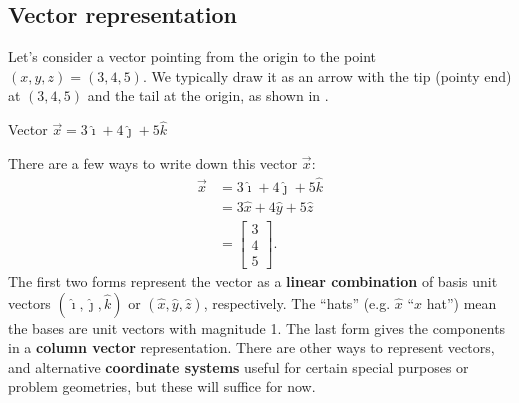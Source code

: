 \documentclass{tufte-handout}
\begin{document}
\subsection{Vector representation}
Let's consider a vector pointing from the origin to the point $(x,y,z)=(3,4,5)$. We typically draw it as an arrow with the tip (pointy end) at $(3,4,5)$ and the tail at the origin, as shown in . 
\begin{marginfigure}
\caption{Vector $\vec{x}=3\hat{\imath} + 4\hat{\jmath} + 5\hat{k}$}
\label{fig:vector1}
\end{marginfigure}
There are a few ways to write down this vector $\vec{x}$:
\begin{align}
\vec{x} &= 3\hat{\imath} + 4\hat{\jmath} + 5\hat{k} \\
&= 3\hat{x} + 4\hat{y} + 5\hat{z} \\
&= \begin{bmatrix} 3 \\ 4 \\ 5 \end{bmatrix}. 
\end{align}
The first two forms represent the vector as a \textbf{linear combination} of basis unit vectors $(\hat{\imath}, \hat{\jmath}, \hat{k})$ or $(\hat{x}, \hat{y}, \hat{z})$, respectively. The ``hats'' (e.g. $\hat{x}$ ``$x$ hat'') mean the bases are unit vectors with magnitude 1. The last form gives the components in a \textbf{column vector} representation. There are other ways to represent vectors, and alternative \textbf{coordinate systems} useful for certain special purposes or problem geometries, but these will suffice for now. 
\end{document}
